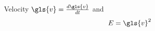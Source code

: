 \documentclass{article}
\begin{document}
Velocity $\gls{v} = \frac{d\gls{v}}{dt}$ and
\begin{equation} E = \gls{v}^2 \end{equation}
\printglossary[type=symbols]
\end{document}
